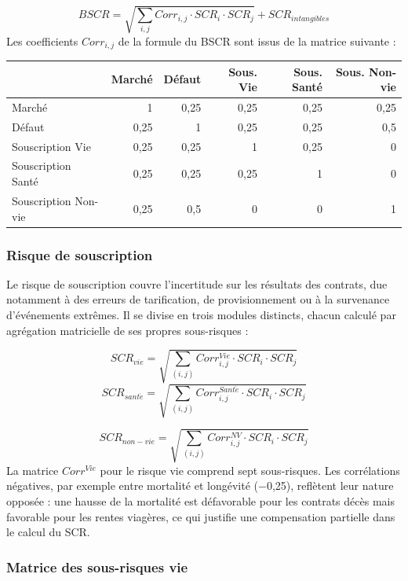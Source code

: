 \documentclass[
]{article}
\begin{document}
\[BSCR = \sqrt{\sum_{i,j} Corr_{i,j} \cdot SCR_i \cdot SCR_j} + SCR_{intangibles}\]
Les coefficients \(Corr_{i,j}\) de la formule du BSCR sont issus de la
matrice suivante :

\begin{longtable}[]{@{}lrrrrr@{}}
\toprule\noalign{}
& Marché & Défaut & Sous. Vie & Sous. Santé & Sous. Non-vie \\
\midrule\noalign{}
\endhead
\bottomrule\noalign{}
\endlastfoot
Marché & 1 & 0,25 & 0,25 & 0,25 & 0,25 \\
Défaut & 0,25 & 1 & 0,25 & 0,25 & 0,5 \\
Souscription Vie & 0,25 & 0,25 & 1 & 0,25 & 0 \\
Souscription Santé & 0,25 & 0,25 & 0,25 & 1 & 0 \\
Souscription Non-vie & 0,25 & 0,5 & 0 & 0 & 1 \\
\end{longtable}

\subsubsection{Risque de souscription}\label{risque-de-souscription}

Le risque de souscription couvre l'incertitude sur les résultats des
contrats, due notamment à des erreurs de tarification, de
provisionnement ou à la survenance d'événements extrêmes. Il se divise
en trois modules distincts, chacun calculé par agrégation matricielle de
ses propres sous-risques :

\[SCR_{vie} = \sqrt{\sum_{(i,j)} Corr^{Vie}_{i,j} \cdot SCR_i \cdot SCR_j}\]
\[SCR_{sant\acute{e}} = \sqrt{\sum_{(i,j)} Corr^{Sant\acute{e}}_{i,j} \cdot SCR_i \cdot SCR_j}\]

\[SCR_{non-vie} = \sqrt{\sum_{(i,j)} Corr^{NV}_{i,j} \cdot SCR_i \cdot SCR_j}\]
La matrice \(Corr^{Vie}\) pour le risque vie comprend sept sous-risques.
Les corrélations négatives, par exemple entre mortalité et longévité
(−0,25), reflètent leur nature opposée : une hausse de la mortalité est
défavorable pour les contrats décès mais favorable pour les rentes
viagères, ce qui justifie une compensation partielle dans le calcul du
SCR.

\subsubsection{Matrice des sous-risques
vie}\label{matrice-des-sous-risques-vie}
\end{document}
